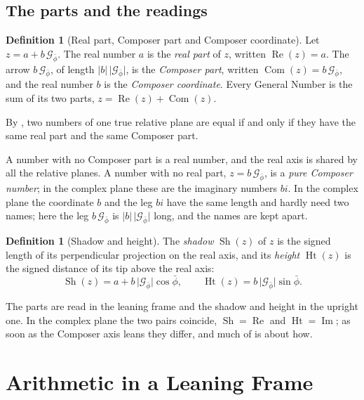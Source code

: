 \documentclass[11pt,a4paper]{amsart}
\theoremstyle{plain}
\theoremstyle{definition}
\newtheorem{definition}[theorem]{Definition}
\theoremstyle{remark}
\newcommand{\pb}{\bar{\phi}}                     %
\newcommand{\Gp}{\mathcal{G}_{\bar{\phi}}}       %
\renewcommand{\Re}{\operatorname{Re}}            %
\DeclareMathOperator{\Com}{Com}                  %
\DeclareMathOperator{\Sh}{Sh}                    %
\DeclareMathOperator{\Ht}{Ht}                    %
\begin{document}
\subsection{The parts and the readings}\label{subsec:parts}

\begin{definition}[Real part, Composer part and Composer coordinate]\label{def:parts}
Let $z = a + b\,\Gp$. The real number $a$ is the \emph{real part} of $z$, written $\Re(z) = a$. The arrow $b\,\Gp$, of length $\lvert b\rvert\,\lvert\Gp\rvert$, is the \emph{Composer part}, written $\Com(z) = b\,\Gp$, and the real number $b$ is the \emph{Composer coordinate}. Every General Number is the sum of its two parts, $z = \Re(z) + \Com(z)$.
\end{definition}

By , two numbers of one true relative plane are equal if and only if they have the same real part and the same Composer part.

A number with no Composer part is a real number, and the real axis is shared by all the relative planes. A number with no real part, $z = b\,\Gp$, is a \emph{pure Composer number}; in the complex plane these are the imaginary numbers $bi$. In the complex plane the coordinate $b$ and the leg $bi$ have the same length and hardly need two names; here the leg $b\,\Gp$ is $\lvert b\rvert\,\lvert\Gp\rvert$ long, and the names are kept apart.

\begin{definition}[Shadow and height]\label{def:shadow-height}
The \emph{shadow} $\Sh(z)$ of $z$ is the signed length of its perpendicular projection on the real axis, and its \emph{height} $\Ht(z)$ is the signed distance of its tip above the real axis:
\[
\Sh(z) = a + b\,\lvert\Gp\rvert\cos\pb , \qquad \Ht(z) = b\,\lvert\Gp\rvert\sin\pb .
\]
\end{definition}

The parts are read in the leaning frame and the shadow and height in the upright one. In the complex plane the two pairs coincide, $\Sh = \Re$ and $\Ht = \operatorname{Im}$; as soon as the Composer axis leans they differ, and much of  is about how.

\section{Arithmetic in a Leaning Frame}\label{sec:arith}
\end{document}
